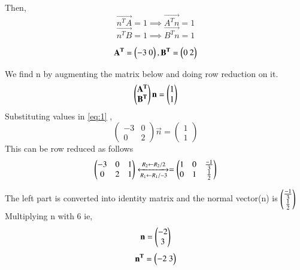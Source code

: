 \documentclass[journal,12pt,twocolumn]{IEEEtran}
\begin{document}
Then,
\begin{equation}
    \vec{n^TA}=1 \implies \vec{A^Tn}=1
\end{equation}
\begin{equation}
\vec{n^TB}=1 \implies \vec{B^Tn}=1
\end{equation}

\begin{equation}
 \mathbf{A^T}=\begin{pmatrix}-3 \ 0\end{pmatrix} ,  \mathbf{B^T}=\begin{pmatrix}0 \ 2\end{pmatrix}
\end{equation}

We find n by augmenting the matrix below and doing row reduction on it.\\
\begin{align}
\begin{pmatrix}\mathbf{A^T} \\ \mathbf{B^T}\end{pmatrix}\mathbf{n} = \begin{pmatrix}1\\1\end{pmatrix}\label{eq:1}
\end{align}
Substituting values in \ref{eq:1} ,\\

 \begin{equation}
\left( \begin{array}{cc}
-3 & 0 \\
0 & 2
\end{array} \right)\vec{n}
=
\left( \begin{array}{cc}
 1\\
1
\end{array} \right)
\end{equation}
This can be row reduced as follows\\
\begin{equation}
\begin{pmatrix}-3 & 0 & 1\\0 & 2 & 1\end{pmatrix} 
\xleftrightarrow [R_1\leftarrow R_1/-3]{R_2\leftarrow R_2/2}
=
\begin{pmatrix}1 & 0 & \frac{-1}{3}\\0 & 1 & \frac{1}{2}\end{pmatrix}
\end{equation}

The left part is converted into identity matrix and the normal vector(n) is $\begin{pmatrix}\frac{-1}{3}\\\frac{1}{2}\end{pmatrix}$\\

Multiplying n with 6 
ie,\\
\begin{equation}
    \mathbf{n} = \begin{pmatrix}{-2}\\ {3}\end{pmatrix}
\end{equation}
\begin{equation}
\mathbf{n^T}  = \begin{pmatrix}{-2}\ {3}\end{pmatrix}
      \end{equation} 
\end{document}
